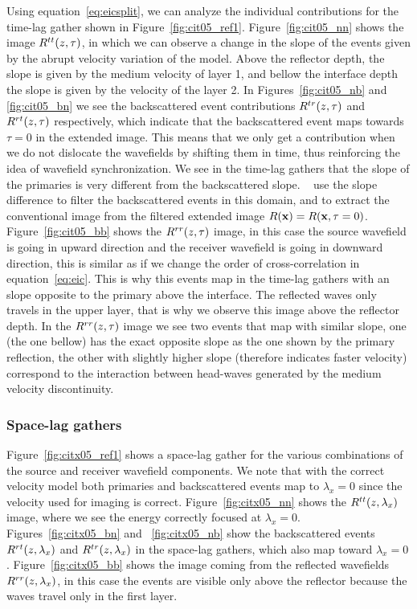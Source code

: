 Using equation~\ref{eq:eicsplit}, we can analyze the individual contributions
for the time-lag gather shown in Figure~\ref{fig:cit05_ref1}. Figure~\ref{fig:cit05_nn} shows the image $R^{tt}(z,\tau)$,
in which we can observe a change in the slope of the events given by the abrupt velocity variation of the model. 
%
Above the reflector depth, the slope is given by the medium velocity of layer 1, and bellow the interface depth the slope is given
 by the velocity of the layer 2. In Figures~\ref{fig:cit05_nb} and \ref{fig:cit05_bn} we see the backscattered
 event contributions $R^{tr}(z,\tau)$ and $R^{rt}(z,\tau)$ respectively, which indicate that the backscattered event maps towards $\tau=0$
in the extended image. This means that we only get a contribution when we do not dislocate the wavefields by shifting them in time, 
thus reinforcing the idea of wavefield synchronization. We see in the time-lag gathers that the slope of the primaries is very different
from the backscattered slope. ~\cite{kaelin:3125} use the slope difference to filter the backscattered 
events in this domain, and to extract the conventional image from the filtered extended image $R({\bf x})=R({\bf x},\tau=0)$. 
%
%
Figure~\ref{fig:cit05_bb} shows the $R^{rr}(z,\tau)$ image, in this case the source wavefield is going in upward
direction and the receiver wavefield is going in downward direction, this is similar as if we change the order of cross-correlation in
equation~\ref{eq:eic}. This is why this events map in the time-lag gathers with an slope opposite to the primary above the
interface. The reflected waves only travels in the upper layer, that is why we observe this image above the reflector depth. In the $R^{rr}(z,\tau)$
image we see two events that map with similar slope, one (the one bellow) has the exact opposite slope as the one shown by the primary reflection,
the other with slightly higher slope (therefore indicates faster velocity) correspond to the interaction between head-waves generated by 
the medium velocity discontinuity.

\subsubsection{Space-lag gathers}

Figure~\ref{fig:citx05_ref1} shows a space-lag gather for the various combinations of the source and receiver wavefield components. 
We note that with the correct velocity model both primaries and backscattered events map to $\lambda_x=0$ since the velocity used for 
imaging is correct. 
%
Figure~\ref{fig:citx05_nn} shows the $R^{tt}(z,\lambda_x)$ image, where we see the energy correctly focused at $\lambda_x=0$. 
Figures~\ref{fig:citx05_bn} and ~\ref{fig:citx05_nb} show the backscattered events $R^{rt}(z,\lambda_x)$ and $R^{tr}(z,\lambda_x)$ in the space-lag gathers, 
which also map toward $\lambda_x=0$.
%
Figure~\ref{fig:citx05_bb} shows the image coming from the reflected wavefields $R^{rr}(z,\lambda_x)$, in this case the events are
visible only above the reflector because the waves travel only in the first layer.


